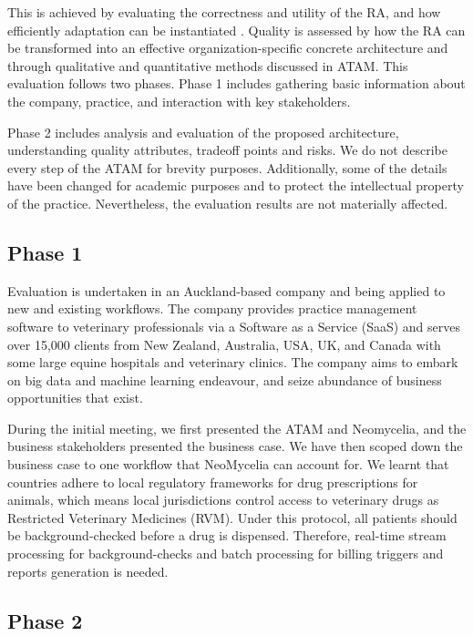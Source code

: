 \documentclass[10pt, conference]{IEEEtran}
\begin{document}
This is achieved by evaluating the correctness and utility of the RA, and how efficiently adaptation can be instantiated \cite{GALSTER}. Quality is assessed by how the RA can be transformed into an effective organization-specific concrete architecture and through qualitative and quantitative methods discussed in ATAM. This evaluation follows two phases. Phase 1 includes gathering basic information about the company, practice, and interaction with key stakeholders.

Phase 2 includes analysis and evaluation of the proposed architecture, understanding quality attributes, tradeoff points and risks. We do not describe every step of the ATAM for brevity purposes. Additionally, some of the details have been changed for academic purposes and to protect the intellectual property of the practice. Nevertheless, the evaluation results are not materially affected.

\subsection{Phase 1}

Evaluation is undertaken in an Auckland-based company and being applied to new and existing workflows. The company provides practice management software to veterinary professionals via a Software as a Service (SaaS) and serves over 15,000 clients from New Zealand, Australia, USA, UK, and Canada with some large equine hospitals and veterinary clinics. The company aims to embark on big data and machine learning endeavour, and seize abundance of business opportunities that exist.

During the initial meeting, we first presented the ATAM and Neomycelia, and the business stakeholders presented the business case. We have then scoped down the business case to one workflow that NeoMycelia can account for. We learnt that countries adhere to local regulatory frameworks for drug prescriptions for animals, which means local jurisdictions control access to veterinary drugs as Restricted Veterinary Medicines (RVM). Under this protocol, all patients should be background-checked before a drug is dispensed. Therefore, real-time stream processing for background-checks and batch processing for billing triggers and reports generation is needed.

\subsection{Phase 2}
\end{document}
